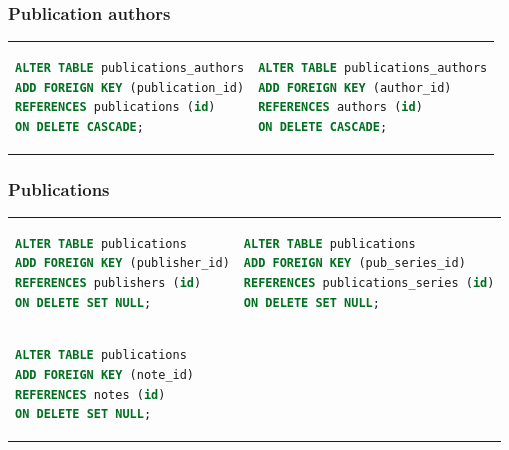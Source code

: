 \documentclass[doubleside, titlepage]{article}
\begin{document}
\subsubsection{Publication authors}
\begin{tabular}{ ll }
\begin{minipage}{3in}
\begin{lstlisting}[language=SQL,showspaces=false,basicstyle=\ttfamily,numberstyle=\tiny,commentstyle=\color{gray}
        ]
ALTER TABLE publications_authors
ADD FOREIGN KEY (publication_id)
REFERENCES publications (id)
ON DELETE CASCADE;
\end{lstlisting}
\end{minipage}
&
\begin{minipage}{3in}
\begin{lstlisting}[language=SQL,showspaces=false,basicstyle=\ttfamily,numberstyle=\tiny,commentstyle=\color{gray}
        ]
ALTER TABLE publications_authors
ADD FOREIGN KEY (author_id)
REFERENCES authors (id)
ON DELETE CASCADE;
\end{lstlisting}
\end{minipage}
\end{tabular}

\subsubsection{Publications}
\begin{tabular}{ ll }
\begin{minipage}{3in}
\begin{lstlisting}[language=SQL,showspaces=false,basicstyle=\ttfamily,numberstyle=\tiny,commentstyle=\color{gray}
        ]
ALTER TABLE publications
ADD FOREIGN KEY (publisher_id)
REFERENCES publishers (id)
ON DELETE SET NULL;
\end{lstlisting}
\end{minipage}
&
\begin{minipage}{3in}
\begin{lstlisting}[language=SQL,showspaces=false,basicstyle=\ttfamily,numberstyle=\tiny,commentstyle=\color{gray}
        ]
ALTER TABLE publications
ADD FOREIGN KEY (pub_series_id)
REFERENCES publications_series (id)
ON DELETE SET NULL;
\end{lstlisting}
\end{minipage}
\\
\begin{minipage}{3in}
\begin{lstlisting}[language=SQL,showspaces=false,basicstyle=\ttfamily,numberstyle=\tiny,commentstyle=\color{gray}
        ]
ALTER TABLE publications
ADD FOREIGN KEY (note_id)
REFERENCES notes (id)
ON DELETE SET NULL;
\end{lstlisting}
\end{minipage}
\end{tabular}
\end{document}
